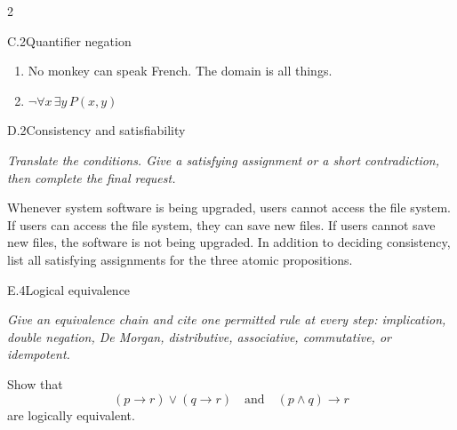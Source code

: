 \documentclass[9pt]{extarticle}
\begin{document}
\begin{multicols}{2}
\begin{CoreProblem}{C.2}{Quantifier negation}
\begin{enumerate}[label=(\alph*)]
  \item No monkey can speak French. The domain is all things.
  \item $\neg\forall x\,\exists y\,P(x,y)$
\end{enumerate}
\end{CoreProblem}
\columnbreak
\begin{CoreProblem}{D.2}{Consistency and satisfiability}
{\scriptsize\textit{Translate the conditions. Give a satisfying assignment or a short contradiction, then complete the final request.}\par}
Whenever system software is being upgraded, users cannot access the file
system. If users can access the file system, they can save new files. If users
cannot save new files, the software is not being upgraded. In addition to
deciding consistency, list all satisfying assignments for the three atomic
propositions.
\end{CoreProblem}
\begin{CoreProblem}{E.4}{Logical equivalence}
{\scriptsize\textit{Give an equivalence chain and cite one permitted rule at every step: implication, double negation, De Morgan, distributive, associative, commutative, or idempotent.}\par}
Show that
\[
  (p\to r)\lor(q\to r)
  \quad\text{and}\quad
  (p\land q)\to r
\]
are logically equivalent.
\end{CoreProblem}
\end{multicols}
\CoreWorkArea
\FormBreak
{}
\end{document}
